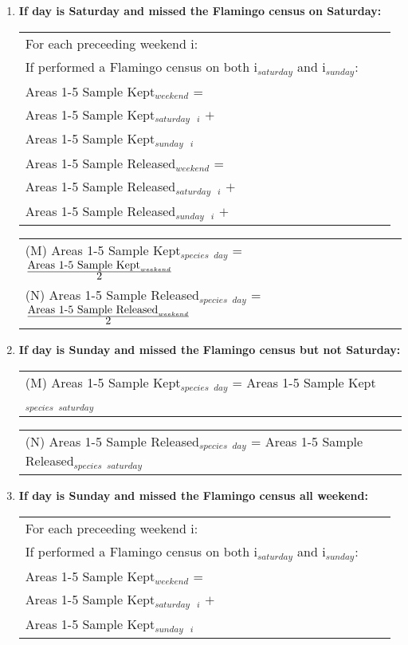 \documentclass[letterpaper,12pt]{article}
\newcommand{\hspacer}{\hspace*{1cm}}
\newcommand{\fraction}[1]{\textrm{\normalsize{#1}}}
\begin{document}
\begin{enumerate}
\item
\textbf{If day is Saturday and missed the Flamingo census on Saturday:} \\
\begin{tabular}{l@{ }l@{ }l}
	For each preceeding weekend i: \\
\hspacer If performed a Flamingo census on both i$_{saturday}$ and i$_{sunday}$: \\
\hspacer \hspacer	Areas 1-5 Sample Kept$_{weekend}$ = \\
\hspacer \hspacer \hspacer Areas 1-5 Sample Kept$_{saturday}$\ $_{i}$ $+$ \\
\hspacer \hspacer \hspacer Areas 1-5 Sample Kept$_{sunday}$\ $_{i}$ \\

\hspacer \hspacer	Areas 1-5 Sample Released$_{weekend}$ = \\
\hspacer \hspacer \hspacer Areas 1-5 Sample Released$_{saturday}$\ $_{i}$ $+$ \\
\hspacer \hspacer \hspacer Areas 1-5 Sample Released$_{sunday}$\ $_{i}$ $+$
\end{tabular}

\begin{tabular}{l@{ }l@{ }l}
	(M) Areas 1-5 Sample Kept$_{species}$ $_{day}$ =
		$
\frac
	{\fraction{Areas 1-5 Sample Kept}_{weekend}}
      	{\fraction{2}}
		$ \\

	(N) Areas 1-5 Sample Released$_{species}$ $_{day}$ =
		$
\frac
	{\fraction{Areas 1-5 Sample Released}_{weekend}}
      	{\fraction{2}}
		$
\end{tabular}

\item
\textbf{If day is Sunday and missed the Flamingo census but not Saturday:} \\
\begin{tabular}{l@{ }}
	(M) Areas 1-5 Sample Kept$_{species}$ $_{day}$ =
		Areas 1-5 Sample Kept$_{species}$ $_{saturday}$
\end{tabular}

\begin{tabular}{l@{ }}
	(N) Areas 1-5 Sample Released$_{species}$ $_{day}$ =
		Areas 1-5 Sample Released$_{species}$ $_{saturday}$
\end{tabular}

\item
\textbf{If day is Sunday and missed the Flamingo census all weekend:} \\
\begin{tabular}{l@{ }l@{ }l}
	For each preceeding weekend i: \\
\hspacer If performed a Flamingo census on both i$_{saturday}$ and i$_{sunday}$: \\
\hspacer \hspacer	Areas 1-5 Sample Kept$_{weekend}$ = \\
\hspacer \hspacer \hspacer Areas 1-5 Sample Kept$_{saturday}$\ $_{i}$ $+$ \\
\hspacer \hspacer \hspacer Areas 1-5 Sample Kept$_{sunday}$\ $_{i}$ \\


\end{tabular}
\end{enumerate}
\end{document}
